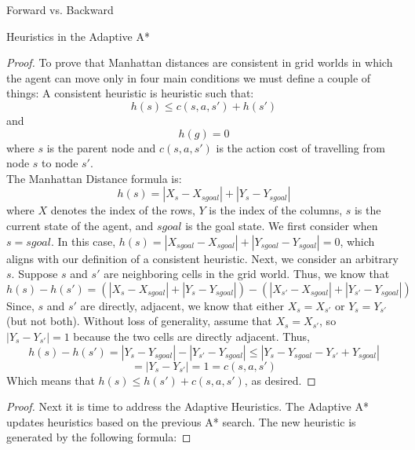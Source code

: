 \documentclass[12pt]{article}
\theoremstyle{definition}
\begin{document}
\begin{onehalfspacing}
\begin{section}{Forward vs. Backward}
\end{section}

\begin{section}{Heuristics in the Adaptive A*}
\begin{proof}
To prove that Manhattan distances are consistent in grid worlds in which the agent can move only in four main conditions we must define a couple of things:
A consistent heuristic is heuristic such that:
\begin{equation*}
    h(s) \leq c(s,a,s') + h(s')
\end{equation*}
and
\begin{equation*}
    h(g) = 0
\end{equation*}
where $s$ is the parent node and $c(s,a,s')$ is the action cost of travelling from node $s$ to node $s'$.\\[0.5em]
The Manhattan Distance formula is:
\begin{equation*}
    h(s) = |X_s - X_{sgoal}| + |Y_s - Y_{sgoal}|
\end{equation*}
where $X$ denotes the index of the rows, $Y$ is the index of the columns, $s$ is the current state of the agent, and $sgoal$ is the goal state. We first consider when $s=sgoal$. In this case, $h(s) = |X_{sgoal} - X_{sgoal}| + |Y_{sgoal} - Y_{sgoal}|=0$, which aligns with our definition of a consistent heuristic. Next, we consider an arbitrary $s$. Suppose $s$ and $s'$ are neighboring cells in the grid world. Thus, we know that
\begin{equation*}
    h(s)-h(s')= (|X_s - X_{sgoal}| + |Y_s - Y_{sgoal}|) - (|X_{s'} - X_{sgoal}| + |Y_{s'} - Y_{sgoal}|)
\end{equation*}
Since, $s$ and $s'$ are directly, adjacent, we know that either $X_s=X_{s'}$ or $Y_s=Y_{s'}$ (but not both). Without loss of generality, assume that $X_s=X_{s'}$, so $|Y_s-Y_{s'}| = 1$ because the two cells are directly adjacent. Thus, 
\begin{equation*}
    h(s)-h(s')= |Y_s - Y_{sgoal}| - |Y_{s'} - Y_{sgoal}| \leq |Y_s - Y_{sgoal} - Y_{s'} + Y_{sgoal}|
\end{equation*}
\begin{equation*}
    =|Y_s - Y_{s'}| = 1 = c(s,a,s')
\end{equation*}
Which means that $h(s)\leq h(s')+c(s,a,s')$, as desired.
\end{proof}
\begin{proof}
Next it is time to address the Adaptive Heuristics. The Adaptive A* updates heuristics based on the previous A* search. The new heuristic is generated by the following formula:

\end{proof}
\end{section}
\end{onehalfspacing}
\end{document}
